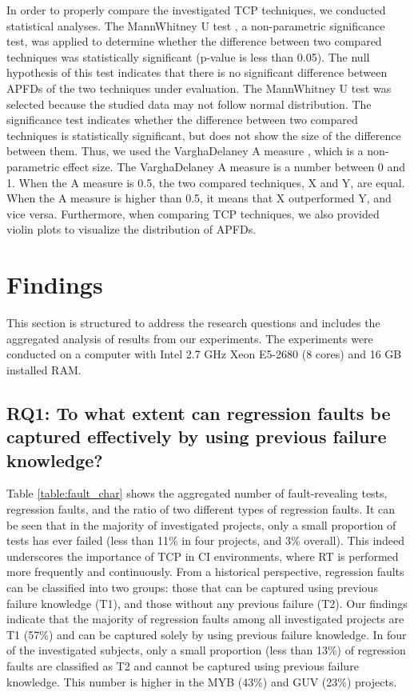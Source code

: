 \documentclass[1p]{elsarticle}
\begin{document}
In order to properly compare the investigated TCP techniques, we conducted statistical analyses. The Mann\textendash Whitney U test \cite{arcuri2011practical}, a non-parametric significance test, was applied to determine whether the difference between two compared techniques was statistically significant (p-value is less than 0.05). The null hypothesis of this test indicates that there is no significant difference between APFDs of the two techniques under evaluation. The Mann\textendash Whitney U test was selected because the studied data may not follow normal distribution. The significance test indicates whether the difference between two compared techniques is statistically significant, but does not show the size of the difference between them. Thus, we used the Vargha\textendash Delaney A measure \cite{arcuri2011practical}, which is a non-parametric effect size. The Vargha\textendash Delaney A measure is a number between 0 and 1. When the A measure is 0.5, the two compared techniques, X and Y, are equal. When the A measure is higher than 0.5, it means that X outperformed Y, and vice versa. Furthermore, when comparing TCP techniques, we also provided violin plots to visualize the distribution of APFDs.


\section{Findings}
This section is structured to address the research questions and includes the aggregated analysis of results from our experiments. The experiments were conducted on a computer with Intel 2.7 GHz Xeon E5-2680 (8 cores) and 16 GB installed RAM.

\subsection{RQ1: To what extent can regression faults be captured effectively by using previous failure knowledge?}

Table \ref{table:fault_char} shows the aggregated number of fault-revealing tests, regression faults, and the ratio of two different types of regression faults. It can be seen that in the majority of investigated projects, only a small proportion of tests has ever failed (less than 11\% in four projects, and 3\% overall). This indeed underscores the importance of TCP in CI environments, where RT is performed more frequently and continuously. From a historical perspective, regression faults can be classified into two groups: those that can be captured using previous failure knowledge (T1), and those without any previous failure (T2). Our findings indicate that the majority of regression faults among all investigated projects are T1 (57\%) and can be captured solely by using previous failure knowledge. In four of the investigated subjects, only a small proportion (less than 13\%) of regression faults are classified as T2 and cannot be captured using previous failure knowledge. This number is higher in the MYB (43\%) and GUV (23\%) projects.
\end{document}
